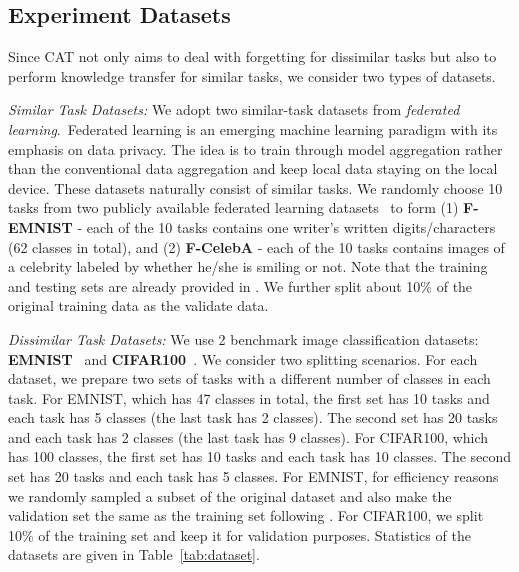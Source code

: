 \documentclass{article}
\begin{document}
\subsection{Experiment Datasets}
{\color{black}
Since CAT not only aims to deal with forgetting for dissimilar tasks but also to perform knowledge transfer for similar tasks, we consider two types of datasets. 

\textit{Similar Task Datasets:} We adopt two similar-task datasets from {\em federated learning}.~Federated learning is an emerging machine learning paradigm with its emphasis on data privacy. The idea is to train through model aggregation rather than the conventional data aggregation and keep local data staying on the local device. These datasets naturally consist of similar tasks. We randomly choose 10 tasks from two publicly available federated learning datasets~\citep{DBLP:journals/corr/abs-1812-01097} to form (1) \textbf{F-EMNIST} - each of the 10 tasks contains one writer's written digits/characters (62 classes in total), and (2) \textbf{F-CelebA} - each of the 10 tasks contains images of a celebrity labeled by whether he/she is smiling or not. {\color{black}Note that the training and testing sets are already provided in \citep{DBLP:journals/corr/abs-1812-01097}. We further split about 10\% of the original training data as the validate data.}


\textit{Dissimilar Task Datasets:} We use 2 benchmark image classification datasets: \textbf{EMNIST}~\citep{lecun1998gradient}
and \textbf{CIFAR100}~\citep{krizhevsky2009learning}. We consider two splitting scenarios. For each dataset, we prepare two sets of tasks with a different number of classes in each task. For EMNIST, which has 47 classes in total, the first set has 10 tasks and each task has 5 classes (the last task has 2 classes). The second set has 20 tasks and each task has 2 classes (the last task has 9 classes). For CIFAR100, which has 100 classes, the first set has 10 tasks and each task has 10 classes. The second set has 20 tasks and each task has 5 classes. {\color{black}For EMNIST, for efficiency reasons we randomly sampled a subset of the original dataset and also make the validation set the same as the training set following \citep{Serra2018overcoming}.}
For CIFAR100, we split 10\% of the training set and keep it for validation purposes. Statistics of the datasets are given in Table~\ref{tab:dataset}.
}
\end{document}
